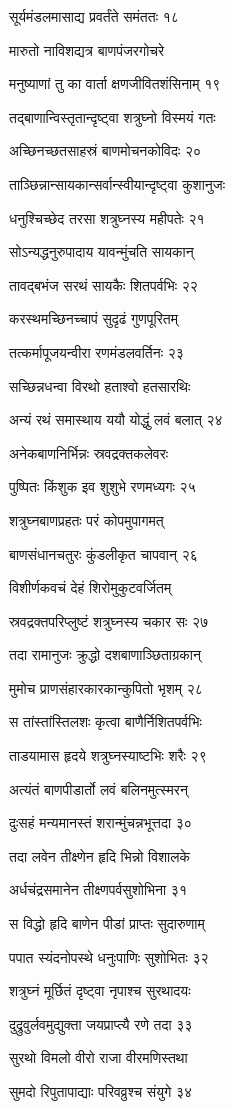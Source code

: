 सूर्यमंडलमासाद्य प्रवर्तंते समंततः १८

मारुतो नाविशद्यत्र बाणपंजरगोचरे

मनुष्याणां तु का वार्ता क्षणजीवितशंसिनाम् १९

तद्बाणान्विस्तृतान्दृष्ट्वा शत्रुघ्नो विस्मयं गतः

अच्छिनच्छतसाहस्रं बाणमोचनकोविदः २०

ताञ्छिन्नान्सायकान्सर्वान्स्वीयान्दृष्ट्वा कुशानुजः

धनुश्चिच्छेद तरसा शत्रुघ्नस्य महीपतेः २१

सोऽन्यद्धनुरुपादाय यावन्मुंचति सायकान्

तावद्बभंज सरथं सायकैः शितपर्वभिः २२

करस्थमच्छिनच्चापं सुदृढं गुणपूरितम्

तत्कर्मापूजयन्वीरा रणमंडलवर्तिनः २३

सच्छिन्नधन्वा विरथो हताश्वो हतसारथिः

अन्यं रथं समास्थाय ययौ योद्धुं लवं बलात् २४

अनेकबाणनिर्भिन्नः स्रवद्रक्तकलेवरः

पुष्पितः किंशुक इव शुशुभे रणमध्यगः २५

शत्रुघ्नबाणप्रहतः परं कोपमुपागमत्

बाणसंधानचतुरः कुंडलीकृत चापवान् २६

विशीर्णकवचं देहं शिरोमुकुटवर्जितम्

स्रवद्रक्तपरिप्लुष्टं शत्रुघ्नस्य चकार सः २७

तदा रामानुजः क्रुद्धो दशबाणाञ्छिताग्रकान्

मुमोच प्राणसंहारकारकान्कुपितो भृशम् २८

स तांस्तांस्तिलशः कृत्वा बाणैर्निशितपर्वभिः

ताडयामास हृदये शत्रुघ्नस्याष्टभिः शरैः २९

अत्यंतं बाणपीडार्तो लवं बलिनमुत्स्मरन्

दुःसहं मन्यमानस्तं शरान्मुंचन्नभूत्तदा ३०

तदा लवेन तीक्ष्णेन हृदि भिन्नो विशालके

अर्धचंद्रसमानेन तीक्ष्णपर्वसुशोभिना ३१

स विद्धो हृदि बाणेन पीडां प्राप्तः सुदारुणाम्

पपात स्यंदनोपस्थे धनुःपाणिः सुशोभितः ३२

शत्रुघ्नं मूर्छितं दृष्ट्वा नृपाश्च सुरथादयः

दुद्रुवुर्लवमुद्युक्ता जयप्राप्त्यै रणे तदा ३३

सुरथो विमलो वीरो राजा वीरमणिस्तथा

सुमदो रिपुतापाद्याः परिवव्रुश्च संयुगे ३४

